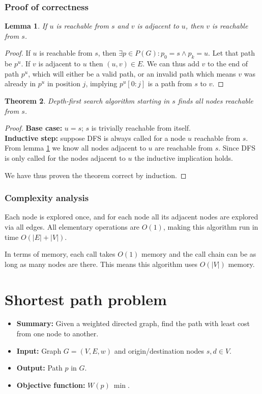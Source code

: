 \documentclass{report}[a4paper]
\newtheorem{theorem}{Theorem}[section]
\newtheorem{lemma}[theorem]{Lemma}
\theoremstyle{remark}
\begin{document}
\subsubsection{Proof of correctness}
\begin{lemma} \label{lem:dfs}
    If $u$ is reachable from $s$ and $v$ is adjacent to $u$, then $v$ is reachable from $s$.
\end{lemma}
\begin{proof}
    If $u$ is reachable from $s$, then $\exists p \in P(G) \colon p_0 = s \wedge p_k = u$. Let that path be $p^u$. If $v$ is adjacent to $u$ then $(u,v) \in E$. We can thus add $v$ to the end of path $p^u$, which will either be a valid path, or an invalid path which means $v$ was already in $p^u$ in position $j$, implying $p^u[0:j]$ is a path from $s$ to $v$.
\end{proof}
\begin{theorem}
    Depth-first search algorithm starting in $s$ finds all nodes reachable from $s$.
\end{theorem}
\begin{proof} \textbf{Base case:} $u=s$; $s$ is trivially reachable from itself. \\
\textbf{Inductive step:} suppose \textsc{DFS} is always called for a node $u$ reachable from $s$. From lemma \ref{lem:dfs} we know all nodes adjacent to $u$ are reachable from $s$. Since \textsc{DFS} is only called for the nodes adjacent to $u$ the inductive implication holds.\par
We have thus proven the theorem correct by induction.
\end{proof}
\subsubsection{Complexity analysis}
Each node is explored once, and for each node all its adjacent nodes are explored via all edges. All elementary operations are $O(1)$, making this algorithm run in time $O(|E|+|V|)$.\par
In terms of memory, each call takes $O(1)$ memory and the call chain can be as long as many nodes are there. This means this algorithm uses $O(|V|)$ memory.
\section{Shortest path problem}
\begin{itemize}
    \item \textbf{Summary:} Given a weighted directed graph, find the path with least cost from one node to another.
    \item \textbf{Input:} Graph $G=(V,E,w)$ and origin/destination nodes $s, d \in V$.
    \item \textbf{Output:} Path $p$ in $G$.
    \item \textbf{Objective function:} $W(p)~\min$.
\end{itemize}
\end{document}
